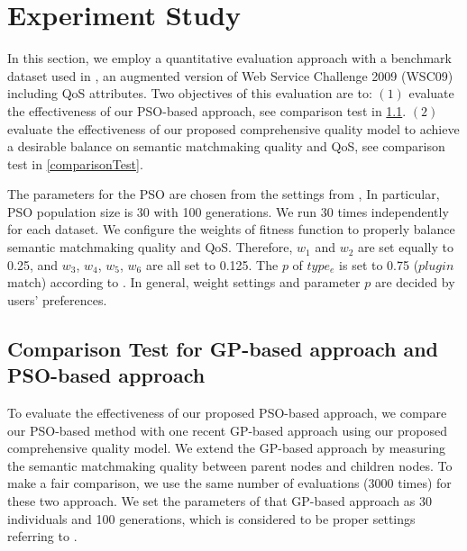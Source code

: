 \documentclass{llncs}
\begin{document}
\section{Experiment Study}\label{experiment_design}
In this section, we employ a quantitative evaluation approach with a benchmark dataset used in \cite{ma2015hybrid,da2016genetic}, an augmented version of Web Service Challenge 2009 (WSC09) including QoS attributes. Two objectives of this evaluation are to: $(1)$ evaluate the effectiveness of our PSO-based approach, see comparison test in \ref{comparisonTestWithGP}.
$(2)$ evaluate the effectiveness of our proposed comprehensive quality model to achieve a desirable balance on semantic matchmaking quality and QoS, see comparison test in \ref{comparisonTest}.



The parameters for the PSO are chosen from the settings from \cite{shi2001particle}, In particular, PSO population size is 30 with 100 generations. We run 30 times independently for each dataset. We configure the weights of fitness function to properly balance semantic matchmaking quality and QoS. Therefore, $w_{1}$ and $w_{2}$ are set equally to 0.25, and $w_{3}$, $w_{4}$, $w_{5}$, $w_{6}$ are all set to 0.125. The $p$ of $type_e$ is set to 0.75 ($plugin$ match) according to \cite{lecue2009optimizing}. In general, weight settings and parameter $p$ are decided by users' preferences.
\vspace{-0.5cm}
\subsection{Comparison Test for GP-based approach and PSO-based approach}\label{comparisonTestWithGP}
To evaluate the effectiveness of our proposed PSO-based approach, we compare our PSO-based method with one recent GP-based approach \cite{ma2015hybrid} using our proposed comprehensive quality model. We extend the GP-based approach by measuring the semantic matchmaking quality between parent nodes and children nodes. To make a fair comparison, we use the same number of evaluations (3000 times) for these two approach. We set the parameters of that GP-based approach as 30 individuals and 100 generations, which is considered to be proper settings referring to \cite{da2015gp}.
\end{document}
